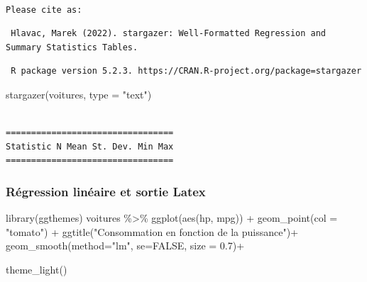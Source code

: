 \documentclass[
  french,
  letterpaper,
  DIV=11,
  numbers=noendperiod]{scrartcl}
\newenvironment{Shaded}{\begin{snugshade}}{\end{snugshade}}
\newcommand{\AttributeTok}[1]{\textcolor[rgb]{0.40,0.45,0.13}{#1}}
\newcommand{\ConstantTok}[1]{\textcolor[rgb]{0.56,0.35,0.01}{#1}}
\newcommand{\FloatTok}[1]{\textcolor[rgb]{0.68,0.00,0.00}{#1}}
\newcommand{\FunctionTok}[1]{\textcolor[rgb]{0.28,0.35,0.67}{#1}}
\newcommand{\NormalTok}[1]{\textcolor[rgb]{0.00,0.23,0.31}{#1}}
\newcommand{\SpecialCharTok}[1]{\textcolor[rgb]{0.37,0.37,0.37}{#1}}
\newcommand{\StringTok}[1]{\textcolor[rgb]{0.13,0.47,0.30}{#1}}
\begin{document}
\begin{verbatim}

Please cite as: 
\end{verbatim}

\begin{verbatim}
 Hlavac, Marek (2022). stargazer: Well-Formatted Regression and Summary Statistics Tables.
\end{verbatim}

\begin{verbatim}
 R package version 5.2.3. https://CRAN.R-project.org/package=stargazer 
\end{verbatim}

\begin{Shaded}
\begin{Highlighting}[]
\FunctionTok{stargazer}\NormalTok{(voitures, }\AttributeTok{type =} \StringTok{"text"}\NormalTok{)}
\end{Highlighting}
\end{Shaded}

\begin{verbatim}

=================================
Statistic N Mean St. Dev. Min Max
=================================
\end{verbatim}

\subsubsection{Régression linéaire et sortie
Latex}\label{ruxe9gression-linuxe9aire-et-sortie-latex}

\begin{Shaded}
\begin{Highlighting}[]
\FunctionTok{library}\NormalTok{(ggthemes)}
\NormalTok{voitures }\SpecialCharTok{\%\textgreater{}\%} \FunctionTok{ggplot}\NormalTok{(}\FunctionTok{aes}\NormalTok{(hp, mpg)) }\SpecialCharTok{+} \FunctionTok{geom\_point}\NormalTok{(}\AttributeTok{col =} \StringTok{"tomato"}\NormalTok{) }\SpecialCharTok{+} 
  \FunctionTok{ggtitle}\NormalTok{(}\StringTok{"Consommation en fonction de la puissance"}\NormalTok{)}\SpecialCharTok{+}
  \FunctionTok{geom\_smooth}\NormalTok{(}\AttributeTok{method=}\StringTok{"lm"}\NormalTok{, }\AttributeTok{se=}\ConstantTok{FALSE}\NormalTok{, }\AttributeTok{size =} \FloatTok{0.7}\NormalTok{)}\SpecialCharTok{+}
  
  \FunctionTok{theme\_light}\NormalTok{()}
\end{Highlighting}
\end{Shaded}
\end{document}
